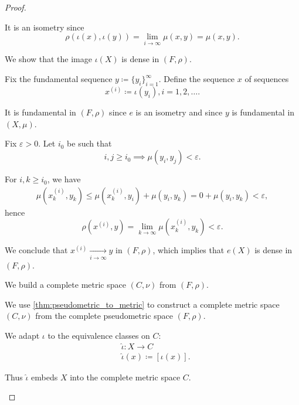 \begin{proof}
\begin{defenum}
    It is an isometry since
    \begin{equation*}
      \rho(\iota(x),\iota(y)) = \lim_{i \to \infty} \mu(x, y) = \mu(x, y).
    \end{equation*}

     We show that the image \( \iota(X) \) is dense in \( (F, \rho) \).

    Fix the fundamental sequence \( y \coloneqq \{ y_i \}_{i=1}^\infty \). Define the sequence \( x \) of sequences
    \begin{equation*}
      x^{(i)} \coloneqq \iota(y_i), i = 1, 2, \ldots.
    \end{equation*}

    It is fundamental in \( (F, \rho) \) since \( e \) is an isometry and since \( y \) is fundamental in \( (X, \mu) \).

    Fix \( \varepsilon > 0 \). Let \( i_0 \) be such that
    \begin{equation*}
      i, j \geq i_0 \implies \mu(y_i, y_j) < \varepsilon.
    \end{equation*}

    For \( i, k \geq i_0 \), we have
    \begin{align*}
      \mu(x_k^{(i)}, y_k)
      \leq
      \mu(x_k^{(i)}, y_i) + \mu(y_i, y_k)
      =
      0 + \mu(y_i, y_k)
      <
      \varepsilon,
    \end{align*}
    hence
    \begin{equation*}
      \rho(x^{(i)}, y) = \lim_{k \to \infty} \mu(x_k^{(i)}, y_k) < \varepsilon.
    \end{equation*}

    We conclude that \( x^{(i)} \xrightarrow[i \to \infty]{} y \) in \( (F, \rho) \), which implies that \( e(X) \) is dense in \( (F, \rho) \).

     We build a complete metric space \( (C, \nu) \) from \( (F, \rho) \).

    We use \cref{thm:pseudometric_to_metric} to construct a complete metric space \( (C, \nu) \) from the complete pseudometric space \( (F, \rho) \).

    We adapt \( \iota \) to the equivalence classes on \( C \):
    \begin{align*}
      &\hat\iota: X \to C \\
      &\hat\iota(x) \coloneqq [\iota(x)].
    \end{align*}

    Thus \( \hat\iota \) embeds \( X \) into the complete metric space \( C \).
  \end{defenum}
\end{proof}

